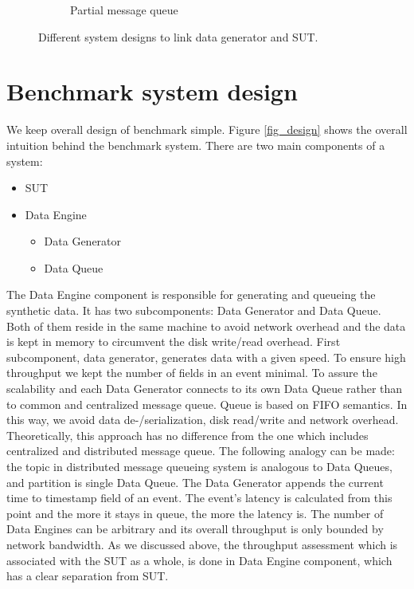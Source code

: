 \documentclass{vldb}
\begin{document}
\begin{figure}
\begin{subfigure}[b]{0.32\textwidth}
        \caption{Partial message queue}
        \label{fig_partial_queue}
    \end{subfigure}
    \label{fig_queue_link}
        \caption{Different system designs to link data generator and SUT.}
\end{figure}



\section{Benchmark system design}
We keep overall design of benchmark simple. Figure \ref{fig_design} shows the overall intuition behind the benchmark system. There are two main components of a system:
\begin{itemize}  
\item SUT
\item Data Engine 
\begin{itemize}  
      \item Data Generator
       \item Data Queue
\end{itemize}

\end{itemize}

The Data Engine component is responsible for generating and queueing the synthetic data. It has two subcomponents: Data Generator and Data Queue. Both of them reside in the same machine to avoid network overhead and the data is kept in memory to circumvent the disk write/read overhead. First subcomponent, data generator, generates data with a given speed. To ensure high throughput we kept the number of fields in an event minimal. To assure the scalability and each Data Generator connects to its own Data Queue rather than to common and centralized message queue. Queue is based on FIFO semantics. In this way, we avoid data de-/serialization, disk read/write and network overhead. Theoretically, this approach has no difference from the one  which includes centralized and distributed message queue. The following analogy can be made: the topic in distributed message queueing system is analogous to Data Queues, and partition is single Data Queue. The Data Generator appends the current time to timestamp field of an event. The event's latency is calculated from this point and the more it stays in queue, the more the latency is. The number of Data Engines can be arbitrary and its overall throughput is only bounded by network bandwidth. As we discussed above, the throughput assessment which is associated with the SUT as a whole,  is done in Data Engine component, which has a clear separation from SUT. 
\end{document}
